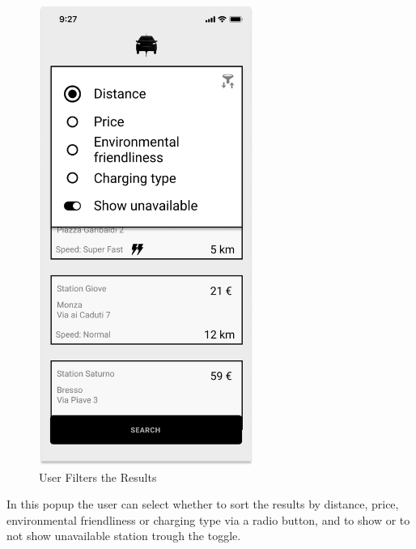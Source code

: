 \begin{figure}[H]
    \centering
    \includegraphics[keepaspectratio, height=15cm]{Mockup/UserAppInterface/Filter Menu.png}
    \caption{User Filters the Results}
    \label{fig:Filters}
\end{figure}
In this popup the user can select whether to sort the results by distance, price, environmental friendliness or charging type via a radio button, and to show or to not show unavailable station trough the toggle.
